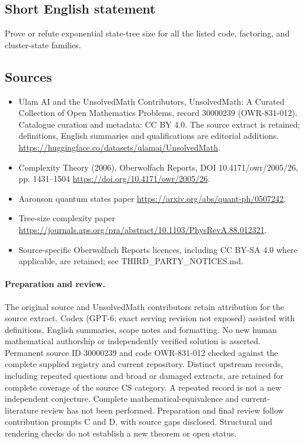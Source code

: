 \documentclass[11pt]{article}
\begin{document}
\subsection{Short English statement}
Prove or refute exponential state-tree size for all the listed code, factoring, and cluster-state families.
\subsection{Sources}
\begin{itemize}
\item[\hypertarget{source:30000239:1}{S1}] Ulam AI and the UnsolvedMath Contributors, UnsolvedMath: A Curated Collection of Open Mathematics Problems, record 30000239 (OWR-831-012). Catalogue curation and metadata: CC BY 4.0. The source extract is retained; definitions, English summaries and qualifications are editorial additions.
\url{https://huggingface.co/datasets/ulamai/UnsolvedMath}.
\item[\hypertarget{source:30000239:2}{S2}] Complexity Theory (2006), Oberwolfach Reports, DOI 10.4171/owr/2005/26, pp. 1431--1504
\url{https://doi.org/10.4171/owr/2005/26}.
\item[\hypertarget{source:30000239:3}{S3}] Aaronson quantum states paper
\url{https://arxiv.org/abs/quant-ph/0507242}.
\item[\hypertarget{source:30000239:4}{S4}] Tree-size complexity paper
\url{https://journals.aps.org/pra/abstract/10.1103/PhysRevA.88.012321}.
\item Source-specific Oberwolfach Reports licences, including CC BY-SA 4.0 where applicable, are retained; see THIRD\_PARTY\_NOTICES.md.
\end{itemize}
\paragraph{Preparation and review.}
The original source and UnsolvedMath contributors retain attribution for the source extract. Codex (GPT-6; exact serving revision not exposed) assisted with definitions, English summaries, scope notes and formatting. No new human mathematical authorship or independently verified solution is asserted. Permanent source ID 30000239 and code OWR-831-012 checked against the complete supplied registry and current repository. Distinct upstream records, including repeated questions and broad or damaged extracts, are retained for complete coverage of the source CS category. A repeated record is not a new independent conjecture. Complete mathematical-equivalence and current-literature review has not been performed. Preparation and final review follow contribution prompts C and D, with source gaps disclosed. Structural and rendering checks do not establish a new theorem or open status.
\label{end:30000239}
\end{document}
